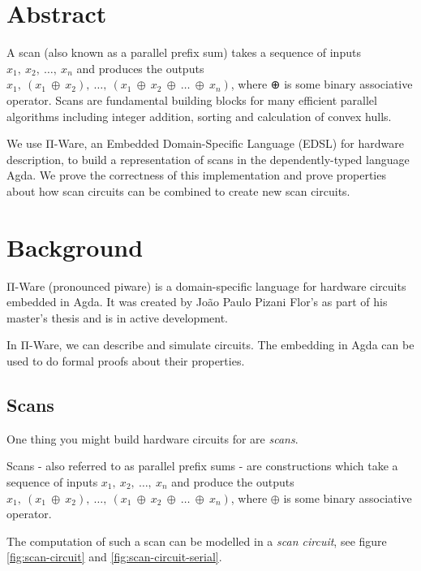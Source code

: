 \section{Abstract}\label{abstract}

A scan (also known as a parallel prefix sum) takes a sequence of inputs
\texorpdfstring{$x_1,\ x_2,\ \ldots{},\ x_n$}{x1, x2, ..., xn} and
produces the outputs \texorpdfstring{$x_1,\ (x_1\ \oplus\ x_2),\
  \ldots{},\ (x_1\ \oplus\ x_2\ \oplus\ \ldots{}\ \oplus\ x_n)$}
{x1, (x1 ⊕ x2), ..., (x1 ⊕ x2 ⊕ ... ⊕ xn)}, where ⊕ is some binary
associative operator.
Scans are fundamental building blocks for many efficient parallel
algorithms including integer addition, sorting and calculation of
convex hulls.

We use Π-Ware, an Embedded Domain-Specific Language (EDSL) for hardware
description, to build a representation of scans in the dependently-typed
language Agda. We prove the correctness of this implementation and
prove properties about how  scan circuits can be combined to create
new scan circuits.

\section{Background}\label{introduction}

Π-Ware (pronounced piware) is a domain-specific language for hardware
circuits embedded in Agda.
It was created by João Paulo Pizani Flor's as part of his master's
thesis\cite{pizani14} and is in active development.

In Π-Ware, we can describe and simulate circuits.
The embedding in Agda can be used to do formal proofs about their
properties.

\subsection{Scans}\label{scans}

One thing you might build hardware circuits for are \emph{scans}.

Scans - also referred to as parallel prefix sums - are constructions
which take a sequence of inputs $x_1,\ x_2,\ \ldots{},\ x_n$ and
produce the outputs $x_1,\ (x_1\ \oplus\ x_2),\ \ldots{},\ (x_1\
\oplus\ x_2\ \oplus\ \ldots{}\ \oplus\ x_n)$, where $\oplus$ is some
binary associative operator.

The computation of such a scan can be modelled in a \emph{scan
  circuit}, see figure \ref{fig:scan-circuit} and
\ref{fig:scan-circuit-serial}.

